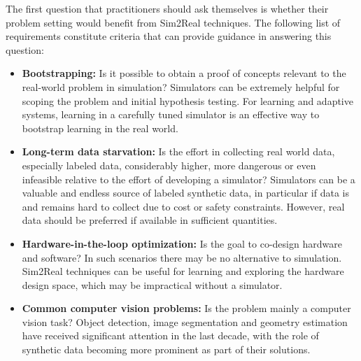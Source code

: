 The first question that practitioners should ask themselves is whether their problem setting would benefit from Sim2Real techniques. The following list of requirements constitute criteria that can provide guidance in answering this question:
\begin{itemize}
\item {\bf Bootstrapping:} Is it possible to obtain a proof of concepts relevant to the real-world problem in simulation? Simulators can be extremely helpful for scoping the problem and initial hypothesis testing. 
For learning and adaptive systems, learning in a carefully tuned simulator is an effective way to bootstrap learning in the real world.
\item {\bf Long-term data starvation:} Is the effort in collecting real world data, especially labeled data, considerably higher, more dangerous or even infeasible relative to the effort of developing a simulator? Simulators can be a valuable and endless source of labeled synthetic data, in particular if data is and remains hard to collect due to cost or safety constraints. However, real data should be preferred if available in sufficient quantities.
\item {\bf Hardware-in-the-loop optimization:} Is the goal to co-design hardware and software? In such scenarios there may be no alternative to simulation. Sim2Real techniques can be useful for learning and exploring the hardware design space, which may be impractical without a simulator. %

\item {\bf Common computer vision problems:} Is the problem mainly a computer vision task? Object detection, image segmentation and geometry estimation have received significant attention in the last decade, with the role of synthetic data becoming more prominent as part of their solutions.
\end{itemize}

